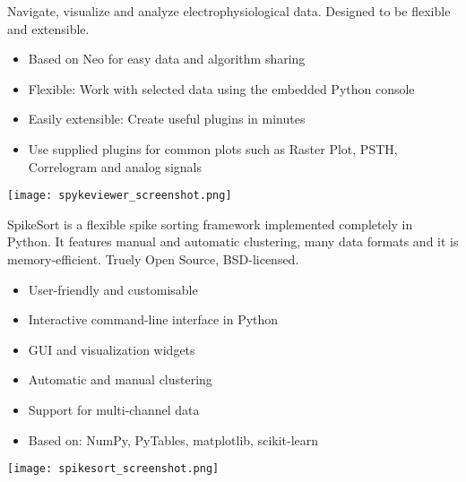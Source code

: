 \begin{multicols}{3}
\columnbreak



Navigate, visualize and analyze electrophysiological data. Designed to be flexible and extensible.

\begin{itemize}[nolistsep,topsep=0em,leftmargin=1pc]
\item Based on Neo for easy data and algorithm sharing
\item Flexible: Work with selected data using the embedded Python console
\item Easily extensible: Create useful plugins in minutes
\item Use supplied plugins for common plots such as Raster Plot, PSTH, Correlogram and analog signals
\end{itemize}
\texttt{[image: spykeviewer\_screenshot.png]}




SpikeSort is a flexible spike sorting framework implemented completely
in Python. It features manual and automatic clustering, many data
formats and it is memory-efficient. Truely Open Source, BSD-licensed.

\begin{itemize}[nolistsep,topsep=0em,leftmargin=1pc]
\item User-friendly and customisable
\item Interactive command-line interface in Python
\item GUI and visualization widgets
\item Automatic and manual clustering
\item Support for multi-channel data
\item Based on: NumPy, PyTables, matplotlib, scikit-learn
\end{itemize}

\texttt{[image: spikesort\_screenshot.png]}





\end{multicols}


